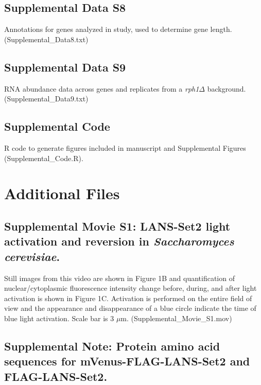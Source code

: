 \documentclass[11pt]{biorxiv}
\newcommand{\rphdelt}{\emph{rph1$\Delta$}\xspace}
\begin{document}
\subsection{Supplemental Data S8}

Annotations for genes analyzed in study, used to determine gene length. (Supplemental\_Data8.txt)

\subsection{Supplemental Data S9}

RNA abundance data across genes and replicates from a \rphdelt background. (Supplemental\_Data9.txt)

\subsection{Supplemental Code}

R code to generate figures included in manuscript and Supplemental Figures (Supplemental\_Code.R).

\section{Additional Files}

\subsection{Supplemental Movie S1: LANS-Set2 light activation and reversion in \emph{Saccharomyces cerevisiae}.}

\noindent Still images from this video are shown in Figure 1B and quantification of nuclear/cytoplasmic fluorescence intensity change before, during, and after light activation is shown in Figure 1C. Activation is performed on the entire field of view and the appearance and disappearance of a blue circle indicate the time of blue light activation. Scale bar is 3 $\mu$m. (Supplemental\_Movie\_S1.mov)

\subsection{Supplemental Note: Protein amino acid sequences for mVenus-FLAG-LANS-Set2 and FLAG-LANS-Set2.}
\end{document}
